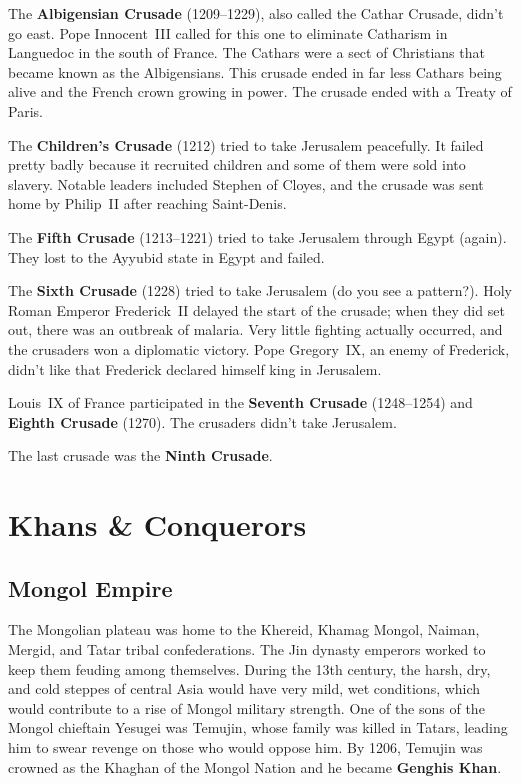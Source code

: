The \textbf{Albigensian Crusade} (1209--1229), also called the Cathar Crusade, didn't go east.
Pope Innocent~III called for this one to eliminate Catharism in Languedoc in the south of France.
The Cathars were a sect of Christians that became known as the Albigensians.
This crusade ended in far less Cathars being alive and the French crown growing in power.
The crusade ended with a Treaty of Paris.

The \textbf{Children's Crusade} (1212) tried to take Jerusalem peacefully.
It failed pretty badly because it recruited children and some of them were sold into slavery.
Notable leaders included Stephen of Cloyes, and the crusade was sent home by Philip~II after reaching Saint-Denis.

The \textbf{Fifth Crusade} (1213--1221) tried to take Jerusalem through Egypt (again).
They lost to the Ayyubid state in Egypt and failed.

The \textbf{Sixth Crusade} (1228) tried to take Jerusalem (do you see a pattern?).
Holy Roman Emperor Frederick~II delayed the start of the crusade;
when they did set out, there was an outbreak of malaria.
Very little fighting actually occurred, and the crusaders won a diplomatic victory.
Pope Gregory~IX, an enemy of Frederick, didn't like that Frederick declared himself king in Jerusalem.

Louis~IX of France participated in the \textbf{Seventh Crusade} (1248--1254) and \textbf{Eighth Crusade} (1270).
The crusaders didn't take Jerusalem.

The last crusade was the \textbf{Ninth Crusade}.

\section{Khans \& Conquerors}

\subsection*{Mongol Empire}

The Mongolian plateau was home to the Khereid, Khamag Mongol, Naiman, Mergid, and Tatar tribal confederations.
The Jin dynasty emperors worked to keep them feuding among themselves.
During the 13th century, the harsh, dry, and cold steppes of central Asia would have very mild, wet conditions,
which would contribute to a rise of Mongol military strength.
One of the sons of the Mongol chieftain Yesugei was Temujin,
whose family was killed in Tatars, leading him to swear revenge on those who would oppose him.
By 1206, Temujin was crowned as the Khaghan of the Mongol Nation and he became \textbf{Genghis Khan}.

